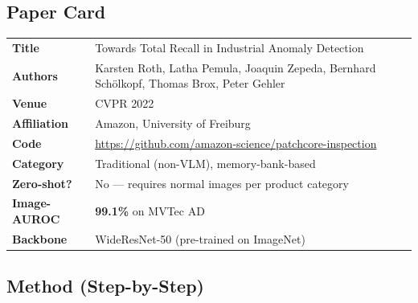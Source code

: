 \documentclass[12pt, a4paper]{article}
\begin{document}
\subsection{Paper Card}
\begin{tabularx}{\textwidth}{@{}lX@{}}
\toprule
\textbf{Title} & Towards Total Recall in Industrial Anomaly Detection \\
\textbf{Authors} & Karsten Roth, Latha Pemula, Joaquin Zepeda, Bernhard Sch\"olkopf, Thomas Brox, Peter Gehler \\
\textbf{Venue} & CVPR 2022 \\
\textbf{Affiliation} & Amazon, University of Freiburg \\
\textbf{Code} & \url{https://github.com/amazon-science/patchcore-inspection} \\
\textbf{Category} & Traditional (non-VLM), memory-bank-based \\
\textbf{Zero-shot?} & No --- requires normal images per product category \\
\textbf{Image-AUROC} & \textbf{99.1\%} on MVTec AD \\
\textbf{Backbone} & WideResNet-50 (pre-trained on ImageNet) \\
\bottomrule
\end{tabularx}

\subsection{Method (Step-by-Step)}
\end{document}
